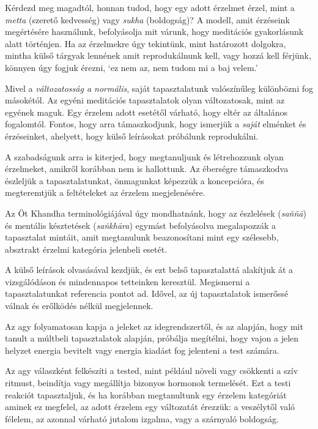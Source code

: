 Kérdezd meg magadtól, honnan tudod, hogy egy adott érzelmet érzel, mint
a \emph{metta} (szerető kedvesség) vagy \emph{sukha} (boldogság)? A
modell, amit érzéseink megértésére használunk, befolyásolja mit várunk,
hogy meditációs gyakorlásunk alatt történjen. Ha az érzelmekre úgy
tekintünk, mint határozott dolgokra, mintha külső tárgyak lennének amit
reprodukálnunk kell, vagy hozzá kell férjünk, könnyen úgy fogjuk érezni,
`ez nem az, nem tudom mi a baj velem.'

Mivel a \emph{változatosság a normális}, saját tapasztalatunk
valószínűleg különbözni fog másokétól. Az egyéni meditációs
tapasztalatok olyan változatosak, mint az egyének maguk. Egy érzelem
adott esetétől várható, hogy eltér az általános fogalomtól. Fontos, hogy
arra támaszkodjunk, hogy ismerjük a \emph{saját} elménket és
érzéseinket, ahelyett, hogy külső leírásokat próbálunk reprodukálni.

A szabadságunk arra is kiterjed, hogy megtanuljunk és létrehozzunk olyan
érzelmeket, amikről korábban nem is hallottunk. Az éberségre támaszkodva
észleljük a tapasztalatunkat, önmagunkat képezzük a koncepcióra, és
megteremtjük a feltételeket az érzelem megjelenésére.

Az Öt Khandha terminológiájával úgy mondhatnánk, hogy az észlelések
(\emph{saññā}) és mentális késztetések (\emph{saṅkhāra}) egymást
befolyásolva megalapozzák a tapasztalat mintáit, amit megtanulunk
beazonosítani mint egy szélesebb, absztrakt érzelmi kategória jelenbeli
esetét.

A külső leírások olvasásával kezdjük, és ezt belső tapasztalattá
alakítjuk át a vizsgálódáson és mindennapos tetteinken keresztül.
Megismerni a tapasztalatunkat referencia pontot ad. Idővel, az új
tapasztalatok ismerőssé válnak és erőlködés nélkül megjelennek.


Az agy folyamatosan kapja a jeleket az idegrendszertől, és az alapján,
hogy mit tanult a múltbeli tapasztalatok alapján, próbálja megítélni,
hogy vajon a jelen helyzet energia bevitelt vagy energia kiadást fog
jelenteni a test számára.

Az agy válaszként felkészíti a tested, mint például növeli vagy
csökkenti a szív ritmust, beindítja vagy megállítja bizonyos hormonok
termelését. Ezt a testi reakciót tapasztaljuk, és ha korábban
megtanultunk egy érzelem kategóriát aminek ez megfelel, az adott érzelem
egy változatát érezzük: a veszélytől való félelem, az azonnal várható
jutalom izgalma, vagy a szárnyaló boldogság.

